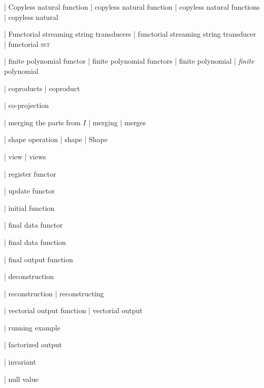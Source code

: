 | Copyless natural function
| copyless natural function
| copyless natural functions
| copyless natural

| Functorial streaming string transducers
| functorial streaming string transducer
| functorial \textsc {sst}

| finite polynomial functor
| finite polynomial functors
| finite polynomial
| \emph {finite} polynomial

| coproducts
| coproduct

| co-projection

| merging the parts from $I$
| merging
| merges

| shape operation
| shape
| Shape

| view
| views

| register functor

| update functor

| initial function

| final data functor

| final data function

| final output function

| deconstruction

| reconstruction
| reconstructing

| vectorial output function
| vectorial output

| running example

| factorized output

| invariant

| null value
